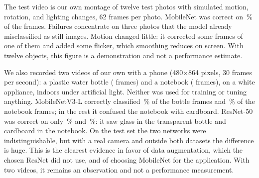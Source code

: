 The test video is our own montage of twelve test photos with simulated motion, rotation, and lighting changes, 62 frames per photo. MobileNet was correct on \VideoAcc\,\% of the frames. Failures concentrate on three photos that the model already misclassified as still images. Motion changed little: it corrected some frames of one of them and added some flicker, which smoothing reduces on screen. With twelve objects, this figure is a demonstration and not a performance estimate.

We also recorded two videos of our own with a phone (480$\times$864 pixels, 30 frames per second): a plastic water bottle (\OwnBottleFrames{} frames) and a notebook (\OwnNotebookFrames{} frames), on a white appliance, indoors under artificial light. Neither was used for training or tuning anything. MobileNetV3-L correctly classified \OwnBottleMob\,\% of the bottle frames and \OwnNotebookMob\,\% of the notebook frames; in the rest it confused the notebook with cardboard. ResNet-50 was correct on only \OwnBottleRes\,\% and \OwnNotebookRes\,\%: it saw glass in the transparent bottle and cardboard in the notebook. On the test set the two networks were indistinguishable, but with a real camera and outside both datasets the difference is huge. This is the clearest evidence in favor of data augmentation, which the chosen ResNet did not use, and of choosing MobileNet for the application. With two videos, it remains an observation and not a performance measurement.
